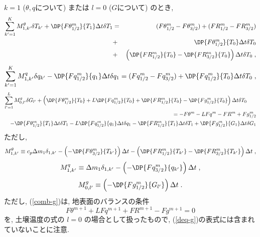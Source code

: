  $k=1$ ($\theta, q$について) または $l=0$ ($G$について) のとき, 
%
  \begin{eqnarray}
    \sum_{k'=1}^{K}  M^\theta_{1,k'} \delta T_{k'}
  +  \DP{F\theta^{m}_{1/2}}{T_1} \Delta t\delta T_1
       & = & (F\theta^{m}_{1/2} - F\theta^{m}_{3/2}) 
        + (FR^{m}_{1/2} - FR^{m}_{3/2})  \nonumber \\
& + &  \DP{F\theta^{m}_{1/2}}{T_0} \Delta t\delta T_0 
     \nonumber \\
& + & \left(\DP{FR^{m}_{1/2}}{T_0} - \DP{FR^{m}_{3/2}}{T_0} \right)
     \Delta t\delta T_0 \; ,
  \label{comb-theta}
  \end{eqnarray}
%
\begin{equation}
 \sum_{k'=1}^{K}  M^q_{1,k'} \delta q_{k'}
         - \DP{Fq^{m}_{1/2}}{q_1} \Delta t\delta q_1
         = (Fq^{m}_{1/2} - Fq^{m}_{3/2}) 
         + \DP{Fq^{m}_{1/2}}{T_0} \Delta t\delta T_0 \; ,
  \label{comb-q}
\end{equation}
%
\begin{eqnarray}
  \lefteqn{\sum_{l'=1}^{L} M^g_{0,l'} \delta G_{l'}
           +  \left(    \DP{F\theta^{m}_{1/2}}{T_0}
           +  L \DP{Fq^{m}_{1/2}}{T_0} 
           +    \DP{FR^{m}_{1/2}}{T_0}
           -  \DP{Fg^{m}_{1/2}}{T_0} \right) \Delta t\delta T_0  }
        \nonumber \\
       & & =  - F\theta^{m} - L Fq^{m} - FR^{m} +  Fg^{m}_{1/2} \nonumber \\
       & & -    \DP{F\theta^{m}_{1/2}}{T_1} \Delta t\delta T_1
           -  L \DP{Fq^{m}_{1/2}}{q_1} \Delta t\delta q_1
           -    \DP{FR^{m}_{1/2}}{T_1} \Delta t\delta T_1
           +    \DP{Fg^{m}_{1/2}}{G_1} \Delta t\delta G_1  
  \label{comb-g}
\end{eqnarray}
%
ただし, 
\begin{equation}
M^{\theta}_{1,k'} \equiv c_p \Delta m_1 \delta_{1,k'}
          -  \left(
                   - \DP{F\theta^{m}_{3/2}}{T_{k'}} \right) \Delta t
          -  \left( \DP{FR^{m}_{1/2}}{T_{k'}} 
                   - \DP{FR^{m}_{3/2}}{T_{k'}} \right) \Delta t \; , 
\end{equation}
\begin{equation}
M^{q}_{1,k'} \equiv \Delta m_1 \delta_{1,k'}
          -  \left(
                   - \DP{Fq^{m}_{3/2}}{q_{k'}} \right) \Delta t \; ,
\end{equation}
\begin{equation}
M^{g}_{0,l'} \equiv
             \left(
                   - \DP{Fg^{m}_{1/2}}{G_{l'}} \right) \Delta t \; .
\end{equation}
%
ただし, (\ref{comb-g})は, 地表面のバランスの条件
\begin{equation}
   F\theta^{m+1} + L Fq^{m+1} + FR^{m+1} - Fg^{m+1} = 0
\end{equation}
を, 土壌温度の式の $l=0$ の場合として扱ったもので, 
(\ref{deq-g})の表式には含まれていないことに注意. 

